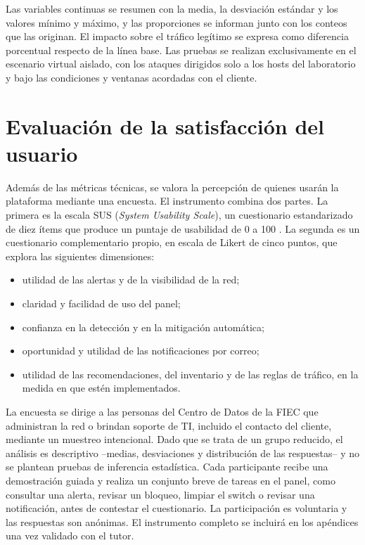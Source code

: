 Las variables continuas se resumen con la media, la desviación estándar y los valores mínimo y máximo, y las proporciones se informan junto con los conteos que las originan. El impacto sobre el tráfico legítimo se expresa como diferencia porcentual respecto de la línea base. Las pruebas se realizan exclusivamente en el escenario virtual aislado, con los ataques dirigidos solo a los hosts del laboratorio y bajo las condiciones y ventanas acordadas con el cliente.

\section{Evaluación de la satisfacción del usuario}
\label{sec:satisfaccion}

Además de las métricas técnicas, se valora la percepción de quienes usarán la plataforma mediante una encuesta. El instrumento combina dos partes. La primera es la escala SUS (\emph{System Usability Scale}), un cuestionario estandarizado de diez ítems que produce un puntaje de usabilidad de 0 a 100 \parencite{brooke1996}. La segunda es un cuestionario complementario propio, en escala de Likert de cinco puntos, que explora las siguientes dimensiones:
\begin{itemize}
    \item utilidad de las alertas y de la visibilidad de la red;
    \item claridad y facilidad de uso del panel;
    \item confianza en la detección y en la mitigación automática;
    \item oportunidad y utilidad de las notificaciones por correo;
    \item utilidad de las recomendaciones, del inventario y de las reglas de tráfico, en la medida en que estén implementados.
\end{itemize}

La encuesta se dirige a las personas del Centro de Datos de la FIEC que administran la red o brindan soporte de TI, incluido el contacto del cliente, mediante un muestreo intencional. Dado que se trata de un grupo reducido, el análisis es descriptivo --medias, desviaciones y distribución de las respuestas-- y no se plantean pruebas de inferencia estadística. Cada participante recibe una demostración guiada y realiza un conjunto breve de tareas en el panel, como consultar una alerta, revisar un bloqueo, limpiar el switch o revisar una notificación, antes de contestar el cuestionario. La participación es voluntaria y las respuestas son anónimas. El instrumento completo se incluirá en los apéndices una vez validado con el tutor.
